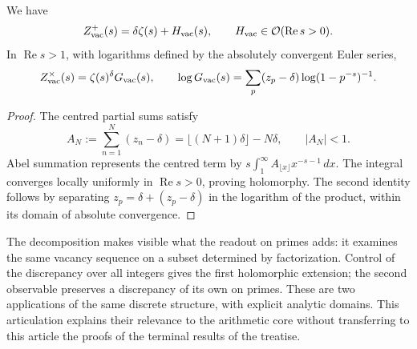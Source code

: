 \begin{proposition}
We have
\[
 Z_{\rm vac}^{+}(s)=\delta\zeta(s)+H_{\rm vac}(s),
 \qquad H_{\rm vac}\in\mathcal O(\operatorname{Re}s>0).
\]
In \(\operatorname{Re}s>1\), with logarithms defined by the absolutely
convergent Euler series,
\[
 Z_{\rm vac}^{\times}(s)=\zeta(s)^\delta G_{\rm vac}(s),\qquad
 \log G_{\rm vac}(s)=
 \sum_p(z_p-\delta)\log(1-p^{-s})^{-1}.
\]
\end{proposition}
\begin{proof}
The centred partial sums satisfy
\[
 A_N:=\sum_{n=1}^N(z_n-\delta)
 =\lfloor(N+1)\delta\rfloor-N\delta,\qquad |A_N|<1.
\]
Abel summation represents the centred term by
\(s\int_1^\infty A_{\lfloor x\rfloor}x^{-s-1}\,dx\). The integral
converges locally uniformly in \(\operatorname{Re}s>0\),
proving holomorphy. The second identity follows by separating
\(z_p=\delta+(z_p-\delta)\) in the logarithm of the product, within
its domain of absolute convergence.
\end{proof}

The decomposition makes visible what the readout on primes adds: it examines
the same vacancy sequence on a subset determined by
factorization. Control of the discrepancy over all integers gives
the first holomorphic extension; the second observable preserves a
discrepancy of its own on primes. These are two applications of the same
discrete structure, with explicit analytic domains. This articulation
explains their relevance to the arithmetic core without transferring to this
article the proofs of the terminal results of the treatise.
